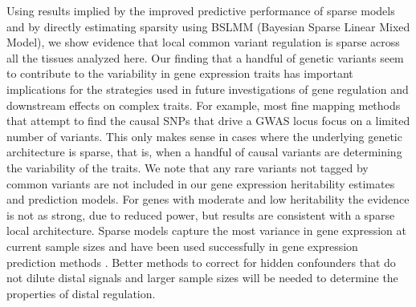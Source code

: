 \documentclass[10pt,letterpaper]{article}
\begin{document}


Using results implied by the improved predictive performance of sparse models and by directly estimating sparsity using BSLMM (Bayesian Sparse Linear Mixed Model), we show evidence that local common variant regulation is sparse across all the tissues analyzed here. Our finding that a handful of genetic variants seem to contribute to the variability in gene expression traits has important implications for the strategies used in future investigations of gene regulation and downstream effects on complex traits. For example, most fine mapping methods that attempt to find the causal SNPs that drive a GWAS locus focus on a limited number of variants. This only makes sense in cases where the underlying genetic architecture is sparse, that is, when a handful of causal variants are determining the variability of the traits. We note that any rare variants not tagged by common variants are not included in our gene expression heritability estimates and prediction models. For genes with moderate and low heritability the evidence is not as strong, due to reduced power, but results are consistent with a sparse local architecture. Sparse models capture the most variance in gene expression at current sample sizes and have been used successfully in gene expression prediction methods \cite{manor2013robust,Gamazon_2015,gusev2016integrative,zhu2016integration}. Better methods to correct for hidden confounders that do not dilute distal signals and larger sample sizes will be needed to determine the properties of distal regulation. 
\end{document}

